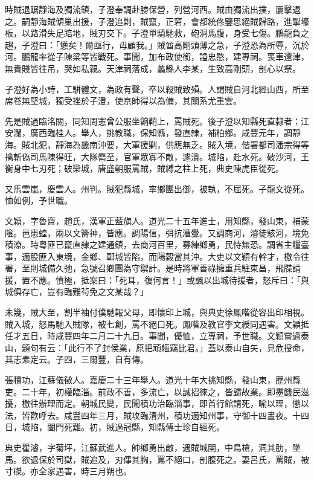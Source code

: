 \begin{pinyinscope}
時賊退踞靜海及獨流鎮，子澄奉調赴勝保營，列營河西。賊由獨流出撲，屢擊退之。嗣靜海賊傾巢出援，子澄追剿，賊竄，正窘，會都統佟鑒思絕賊歸路，進掣壕板，以路滑失足踣地，賊刃交下。子澄單騎馳救，砲洞馬腹，身受七傷。鵬龍負之趨，子澄曰：「憊矣！爾亟行，毋顧我。」賊酋高剛頭薄之急，子澄恐為所辱，沉於河。鵬龍率從子陳梁等皆戰死。事聞，加布政使銜，謚忠愍，建專祠。喪車還津，無貴賤皆往吊，哭如私親。天津祠落成，蠡縣人李某，生致高剛頭，剖心以祭。

子澄好為小詩，工駢體文，為政有聲，卒以殺賊致殞。人謂賊自河北經山西，所至席卷無堅城，獨受挫於子澄，使京師得以為備，其關系尤重雲。

先是賊過臨洺關，同知周憲曾公服坐餉鞘上，罵賊死。後子澄以知縣死直隸者：江安瀾，廣西臨桂人。舉人，挑教職，保知縣，發直隸，補柏鄉。咸豐元年，調靜海。賊北犯，靜海為畿南沖要，大軍援剿，供應無乏。賊入境，偕署都司潘宗得等擒斬偽司馬陳得旺，大隊麕至，官軍眾寡不敵，遽潰。城陷，赴水死。破沙河，王衡身中七刃死；破欒城，唐盛朝服罵賊，賊縛之柱上死，典史陳虎臣從死。

又馬雲嵐，慶雲人。州判。賊犯縣城，率鄉團出御，被執，不屈死。子龍文從死。恤如例，予世職。

文穎，字魯齋，趙氏，漢軍正藍旗人。道光二十五年進士，用知縣，發山東，補蒙陰。邑患蝗，兩以文籥神，皆應。調陽信，弭抗漕釁。又調商河，濬徒駭河，境免積潦。時粵匪已竄直隸之建通鎮，去商河百里，募練鄉勇，民恃無恐。調省主糧臺事，適股匪入東境，金鄉、鄆城皆陷，而陽穀當其沖。大吏以文穎有幹才，檄令往署，至則城備久弛，急號召鄉團為守禦計。是時將軍善祿擁重兵駐東昌，飛牒請援，置不應。憤極，抵案曰：「死耳，復何言！」或諷以出城待援者，怒斥曰：「與城俱存亡，豈有臨難茍免之文某哉？」

未幾，賊大至，割半袖付僕馳報父母，即懷印上城，與典史徐鳳喈從容出印相視。賊入城，怒馬馳入賊隊，被七創，罵不絕口死。鳳喈及教官李文綬同遇害。文穎抵任才五日，時咸豐四年二月二十九日。事聞，優恤，立專祠，予世職。文穎嘗過泰山，題句有云：「此行不了封侯業，原把頑軀竊比君。」蓋以泰山自矢，見危授命，其志素定云。子四，三爾豐，自有傳。

張積功，江蘇儀徵人。嘉慶二十三年舉人。道光十年大挑知縣，發山東，歷州縣吏。二十年，初權臨淄。前政不善，多流亡，以誠招徠之，皆歸故業。即墨饑民滋擾，檄往辦理而定。朝城民變，民聞積功治臨淄事，即首行館請死，喻以理，懲以法，皆歡呼去。咸豐四年三月，賊攻臨清州，積功適知州事，守御十四晝夜。十四日，城陷，闔門死難。初，賊過冠縣，知縣傅士珍自經死。

典史瞿濬，字菊坪，江蘇武進人。帥鄉勇出敵，遇賊城闉，中鳥槍，洞其肋，墜馬。欲退保於司獄，賊追及，刃倳其胸，罵不絕口，剖腹死之。妻呂氏，罵賊，被寸磔。亦全家遇害，時三月朔也。


\end{pinyinscope}
